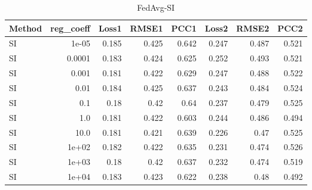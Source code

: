 \begin{table}
\caption{FedAvg-SI}
\begin{tabular}{lrrrrrrr}
\toprule
Method & reg_coeff & Loss1 & RMSE1 & PCC1 & Loss2 & RMSE2 & PCC2 \\
\midrule
SI & 1e-05 & 0.185 & 0.425 & 0.642 & 0.247 & 0.487 & 0.521 \\
SI & 0.0001 & 0.183 & 0.424 & 0.625 & 0.252 & 0.493 & 0.521 \\
SI & 0.001 & 0.181 & 0.422 & 0.629 & 0.247 & 0.488 & 0.522 \\
SI & 0.01 & 0.184 & 0.425 & 0.637 & 0.243 & 0.484 & 0.524 \\
SI & 0.1 & 0.18 & 0.42 & 0.64 & 0.237 & 0.479 & 0.525 \\
SI & 1.0 & 0.181 & 0.422 & 0.603 & 0.244 & 0.486 & 0.494 \\
SI & 10.0 & 0.181 & 0.421 & 0.639 & 0.226 & 0.47 & 0.525 \\
SI & 1e+02 & 0.182 & 0.422 & 0.635 & 0.231 & 0.474 & 0.526 \\
SI & 1e+03 & 0.18 & 0.42 & 0.637 & 0.232 & 0.474 & 0.519 \\
SI & 1e+04 & 0.183 & 0.423 & 0.622 & 0.238 & 0.48 & 0.492 \\
\bottomrule
\end{tabular}
\end{table}
